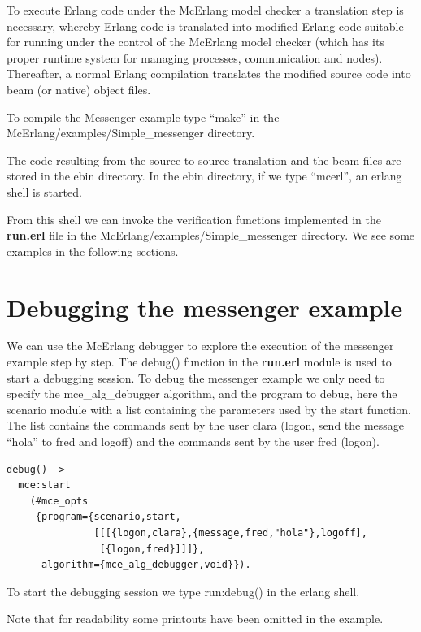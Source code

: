 \documentclass[a4paper]{article}
\newcommand{\mcerl}{mcerl\xspace}
\newcommand{\simplemessengerdir}{McErlang/examples/Simple\_messenger\xspace}
\newcommand{\run}{run.erl\xspace}
\begin{document}
To execute Erlang code under the McErlang model checker a translation
step is necessary, whereby Erlang code is translated into modified
Erlang code suitable for running under the control of the McErlang
model checker (which has its proper runtime system for managing
processes, communication and nodes).  Thereafter, a normal Erlang
compilation translates the modified source code into beam (or native)
object files.


To compile the Messenger example
type ``make'' in the \simplemessengerdir directory. 



The code resulting from the source-to-source translation and the beam
files are stored in the ebin directory. In the ebin directory, if
we type ``\mcerl'', an erlang shell is started.



From this shell we can invoke the verification functions implemented
in the {\bf \run} file in the \simplemessengerdir directory. We see some
examples in the following sections.

\section{Debugging the messenger example}

We can use the McErlang debugger to explore the execution of the
messenger example step by step. The debug() function in the {\bf \run}
module is used to start a debugging session. To debug the messenger
example we only need to specify the mce\_alg\_debugger algorithm, and
the program to debug, here the scenario module with a list containing
the parameters used by the start function. The list contains the
commands sent by the user clara (logon, send the message ``hola'' to
fred and logoff) and the commands sent by the user fred (logon).


\begin{verbatim}
debug() ->
  mce:start
    (#mce_opts
     {program={scenario,start,
               [[[{logon,clara},{message,fred,"hola"},logoff],
                [{logon,fred}]]]},
      algorithm={mce_alg_debugger,void}}).
\end{verbatim}

To start the debugging session we type run:debug() in the erlang shell. 



Note that for readability some printouts have been omitted in the example.
\end{document}
